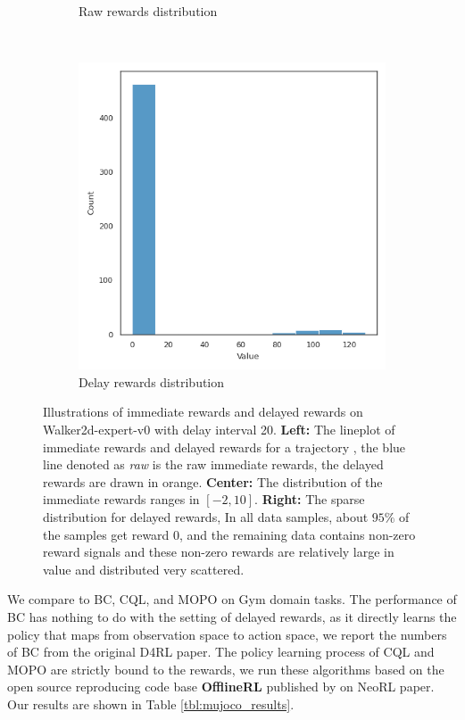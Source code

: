 \begin{figure}[H]
\begin{subfigure}{0.31\textwidth}
        \caption{Raw rewards distribution}
    \end{subfigure}
    ~
    \begin{subfigure}{0.31\textwidth}
        \includegraphics[width=\textwidth]{assets/delay_mode-constant-delay-20_distribution_delay_0_delayed.png}
        \caption{Delay rewards distribution}
    \end{subfigure}
    \caption{Illustrations of immediate rewards and delayed rewards on Walker2d-expert-v0 with delay interval 20. \textbf{Left:} The lineplot of immediate rewards and delayed rewards for a trajectory
        , the blue line denoted as \textit{raw} is the raw immediate rewards, the delayed rewards are drawn in orange. \textbf{Center:} The distribution of the immediate rewards ranges in $\left[-2, 10\right]$.
        \textbf{Right:} The sparse distribution for delayed rewards, In all data samples, about $95\%$ of the samples get reward 0, and the remaining data contains non-zero reward signals and these non-zero rewards are relatively large in value and distributed very scattered.}
    \label{fig:fig1}
\end{figure}


We compare to BC, CQL, and MOPO on Gym domain tasks. The performance of BC has
nothing to do with the setting of delayed rewards, as it directly learns the
policy that maps from observation space to action space, we report the numbers of BC from the original D4RL paper. The policy learning process of CQL and MOPO are strictly bound to the rewards, we run these algorithms based on the
open source reproducing code base \textbf{OfflineRL} published by \citeauthor{qinNeoRLRealWorldBenchmark2021}
on NeoRL paper. Our results are shown in Table \ref{tbl:mujoco_results}.


